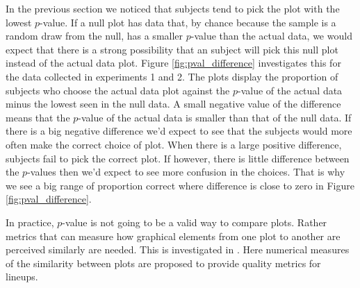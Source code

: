 \documentclass{article}
\newcommand{\blue}[1]{{\color{blue} #1}} %
\newcommand{\green}[1]{{\color{green} #1}} %
\begin{document}
\blue{In the previous section we noticed that subjects tend to pick the plot with the lowest $p$-value. If a null plot has data that, by chance because the sample is a random draw from the null, has a smaller $p$-value than the actual data, we would expect that there is a strong possibility that an subject will pick this null plot instead of the actual data plot. Figure \ref{fig:pval_difference} investigates this for the data collected in experiments 1 and 2. The plots display the proportion of subjects who choose the actual data plot against the $p$-value of the actual data minus the lowest seen in the null data. A small negative value of the difference means that the $p$-value of the actual data is smaller than that of the null data. If there is a big negative difference we'd expect to see that the subjects would more often make the correct choice of plot. When there is a large positive difference, subjects fail to pick the correct plot. If however, there is little difference between the $p$-values then we'd expect to see more confusion in the choices. That is why we see a big range of proportion correct where difference is close to zero in Figure \ref{fig:pval_difference}.}




In practice, $p$-value is not going to be a valid way to compare plots. Rather metrics that can measure how graphical elements from one plot to another are perceived similarly are needed. This is investigated in \citet{niladri:2012}. Here numerical measures of the similarity between plots are proposed to provide quality metrics for lineups.
\end{document}
